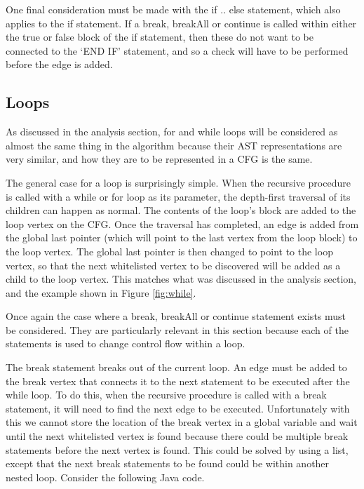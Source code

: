 One final consideration must be made with the if .. else statement, which also applies to the if statement. If a break, breakAll or continue is called within either the true or false block of the if statement, then these do not want to be connected to the `END IF' statement, and so a check will have to be performed before the edge is added. 

\subsection{Loops}

As discussed in the analysis section, for and while loops will be considered as almost the same thing in the algorithm because their AST representations are very similar, and how they are to be represented in a CFG is the same.

The general case for a loop is surprisingly simple. When the recursive procedure is called with a while or for loop as its parameter, the depth-first traversal of its children can happen as normal. The contents of the loop's block are added to the loop vertex on the CFG. Once the traversal has completed, an edge is added from the global last pointer (which will point to the last vertex from the loop block) to the loop vertex. The global last pointer is then changed to point to the loop vertex, so that the next whitelisted vertex to be discovered will be added as a child to the loop vertex. This matches what was discussed in the analysis section, and the example shown in Figure \ref{fig:while}.

Once again the case where a break, breakAll or continue statement exists must be considered. They are particularly relevant in this section because each of the statements is used to change control flow within a loop. 

The break statement breaks out of the current loop. An edge must be added to the break vertex that connects it to the next statement to be executed after the while loop. To do this, when the recursive procedure is called with a break statement, it will need to find the next edge to be executed. Unfortunately with this we cannot store the location of the break vertex in a global variable and wait until the next whitelisted vertex is found because there could be multiple break statements before the next vertex is found. This could be solved by using a list, except that the next break statements to be found could be within another nested loop. Consider the following Java code.

